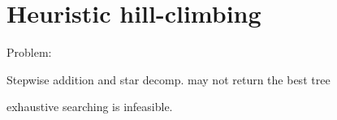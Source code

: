 \documentclass[landscape]{foils}
\begin{document}



\myNewSlide
\section*{Heuristic hill-climbing}
Problem:
\begin{compactitem}
   \item Stepwise addition and star decomp. may not return the best tree
   \item exhaustive searching is infeasible.
\end{compactitem}
\end{document}
